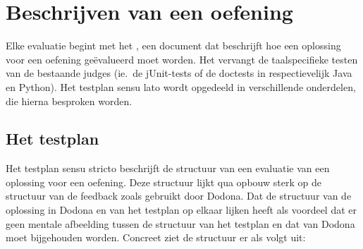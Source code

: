 \section{Beschrijven van een oefening}\label{sec:testplan}

Elke evaluatie begint met het , een document dat beschrijft hoe een oplossing voor een oefening geëvalueerd moet worden.
Het vervangt de taalspecifieke testen van de bestaande judges (ie.\ de jUnit-tests of de doctests in respectievelijk Java en Python).
Het testplan sensu lato wordt opgedeeld in verschillende onderdelen, die hierna besproken worden.

\subsection{Het testplan}\label{subsec:het-testplan}

Het testplan sensu stricto beschrijft de structuur van een evaluatie van een oplossing voor een oefening.
Deze structuur lijkt qua opbouw sterk op de structuur van de feedback zoals gebruikt door Dodona.
Dat de structuur van de oplossing in Dodona en van het testplan op elkaar lijken heeft als voordeel dat er geen mentale afbeelding tussen de structuur van het testplan en dat van Dodona moet bijgehouden worden.
Concreet ziet de structuur er als volgt uit:

